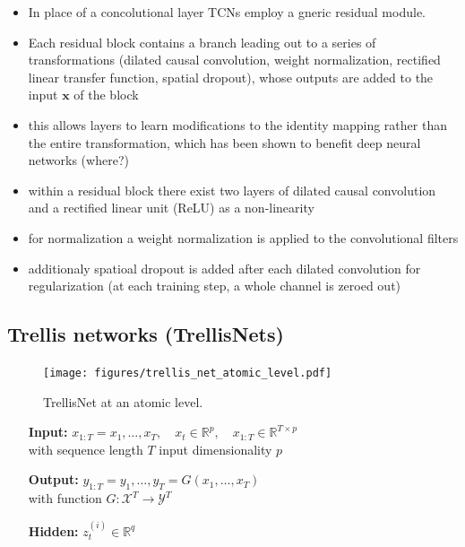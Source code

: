 \documentclass{article}
\begin{document}
\begin{itemize}
\item In place of a concolutional layer TCNs employ a gneric residual module. 
\item Each residual block contains a branch leading out to a series of transformations (dilated causal convolution, weight normalization, rectified linear transfer function, spatial dropout), whose outputs are added to the input $\mathbf x$ of the block
\item this allows layers to learn modifications to the identity mapping rather than the entire transformation, which has been shown to benefit deep neural networks (where?)
\item within a residual block there exist two layers of dilated causal convolution and a rectified linear unit (ReLU) \cite[Nair2010]{Nair2010} as a non-linearity
\item for normalization a weight normalization \cite[Salimans2016]{Salimans2016} is applied to the convolutional filters 
\item additionaly spatioal dropout \cite[Srivastava2014]{Srivastava2014} is added after each dilated convolution for regularization (at each training step, a whole channel is zeroed out)
\end{itemize}


\subsection{Trellis networks (TrellisNets)}
\begin{figure}[htbp]
\centering
\texttt{[image: figures/trellis\_net\_atomic\_level.pdf]}
\caption{TrellisNet at an atomic level.}
\label{fig:TrellisNetAtomic}
\end{figure}	

\begin{itemize}
\item[\textbf{Input:}] $x_{1:T} = x_1, \dots, x_T, \quad x_t \in \mathbb R^p, \quad x_{1:T} \in \mathbb R^{T \times p}$ \vspace{0.5em}\\ 
with sequence length  $T$  input dimensionality  $p$
\item[\textbf{Output:}] $y_{1:T} = y_1, \dots, y_T = G(x_1, \dots, x_T)$ \vspace{0.5em} \\
with function $G: \mathcal X^T \rightarrow \mathcal Y^T$ 
\item[\textbf{Hidden:}] $z_t^{(i)} \in \mathbb R^q$
\end{itemize}
\end{document}
